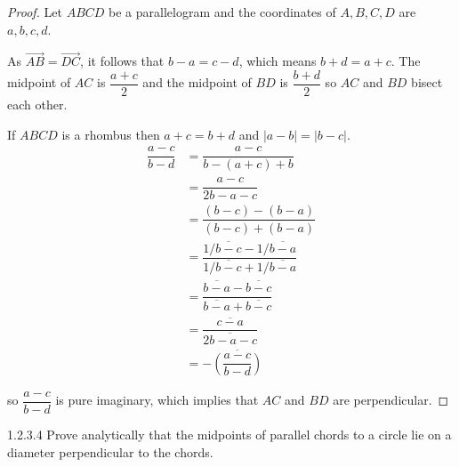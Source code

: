 \begin{proof}
	Let \( ABCD \) be a parallelogram and the coordinates of \( A, B, C, D \) are \( a, b, c, d \).

	As \( \overrightarrow{AB} = \overrightarrow{DC} \), it follows that \( b - a = c - d \), which means \( b + d = a + c \). The midpoint of \( AC \) is \( \dfrac{a + c}{2} \) and the midpoint of \( BD \) is \( \dfrac{b + d}{2} \) so \( AC \) and \( BD \) bisect each other.

	If \( ABCD \) is a rhombus then \( a + c = b + d \) and \( \left\vert a - b \right\vert = \left\vert b - c \right\vert \).
	\begingroup
	\allowdisplaybreaks%
	\begin{align*}
		\dfrac{a - c}{b - d} & = \dfrac{a - c}{b - (a + c) + b}                                                           \\
		                     & = \dfrac{a - c}{2b - a - c}                                                                \\
		                     & = \dfrac{(b - c) - (b - a)}{(b - c) + (b - a)}                                             \\
		                     & = \dfrac{1/\overline{b - c} - 1/\overline{b - a}}{1/\overline{b - c} + 1/\overline{b - a}} \\
		                     & = \dfrac{\overline{b - a} - \overline{b - c}}{\overline{b - a} + \overline{b - c}}         \\
		                     & = \dfrac{\overline{c - a}}{\overline{2b - a - c}}                                          \\
		                     & = -\overline{\left(\dfrac{a - c}{b - d}\right)}
	\end{align*}
	\endgroup

	so \( \dfrac{a - c}{b - d} \) is pure imaginary, which implies that \( AC \) and \( BD \) are perpendicular.
\end{proof}

\begin{problem}{1.2.3.4}
Prove analytically that the midpoints of parallel chords to a circle lie on a diameter perpendicular to the chords.
\end{problem}

